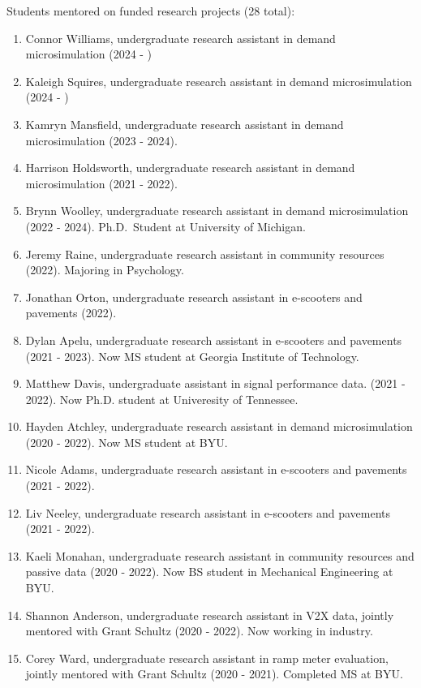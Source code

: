 \documentclass[margin,line]{res}
\newif\ifdetail
\newcounter{enuminitialize}
\newenvironment{myenum}[1][]
{%
 \setcounter{enuminitialize}{#1}
 \addtocounter{enuminitialize}{2}
 \begin{enumerate}[left= 4pt, itemsep=8pt, start=\value{enuminitialize}, label=\arabic*\addtocounter{enumi}{-2}]
}
{%
 \end{enumerate}
}
\begin{document}
\begin{resume}
Students mentored on funded research projects (28 total):
\vspace{0.2cm}
\begin{myenum}[28]
  \ifdetail {\color{NavyBlue} \fi
  \item Connor Williams, undergraduate research assistant in demand microsimulation (2024 - )
  \item Kaleigh Squires, undergraduate research assistant in demand microsimulation (2024 - )
  \item Kamryn Mansfield, undergraduate research assistant in demand microsimulation (2023 - 2024).
  \item Harrison Holdsworth, undergraduate research assistant in demand microsimulation (2021 - 2022).
  \item Brynn Woolley, undergraduate research assistant in demand microsimulation (2022 - 2024). Ph.D.\ Student at University of Michigan.
  \item Jeremy Raine, undergraduate research assistant in community resources (2022). Majoring in Psychology.
  \item Jonathan Orton, undergraduate research assistant in e-scooters and pavements (2022).
  \ifdetail } \fi
  \item Dylan Apelu, undergraduate research assistant in e-scooters and pavements (2021 - 2023). Now MS student at Georgia Institute of Technology.
  \item Matthew Davis, undergraduate assistant in signal performance data. (2021 - 2022). Now Ph.D. student at Univeresity of Tennessee.
  \item Hayden Atchley, undergraduate research assistant in demand microsimulation (2020 - 2022). Now MS student at BYU.
  \item Nicole Adams, undergraduate research assistant in e-scooters and pavements (2021 - 2022). 
  \item Liv Neeley, undergraduate research assistant in e-scooters and pavements (2021 - 2022). 
  \item Kaeli Monahan, undergraduate research assistant in community resources and passive data (2020 - 2022). Now BS student in Mechanical Engineering at BYU.
  \item Shannon Anderson, undergraduate research assistant in V2X data, jointly mentored with Grant Schultz (2020 - 2022). Now working in industry.
  \item Corey Ward, undergraduate research assistant in ramp meter evaluation, jointly mentored with Grant Schultz (2020 - 2021). Completed MS at BYU.

\end{myenum}
\end{resume}
\end{document}
